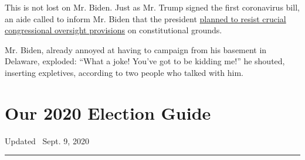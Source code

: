 This is not lost on Mr. Biden. Just as Mr. Trump signed the first
coronavirus bill, an aide called to inform Mr. Biden that the president
\href{https://www.nytimes3xbfgragh.onion/2020/03/27/us/trump-signing-statement-coronavirus.html}{planned
to resist crucial congressional oversight provisions} on constitutional
grounds.

Mr. Biden, already annoyed at having to campaign from his basement in
Delaware, exploded: ``What a joke! You've got to be kidding me!'' he
shouted, inserting expletives, according to two people who talked with
him.

\hypertarget{our-2020-election-guide}{%
\section{Our 2020 Election Guide}\label{our-2020-election-guide}}

Updated ~Sept. 9, 2020

\begin{center}\rule{0.5\linewidth}{\linethickness}\end{center}

